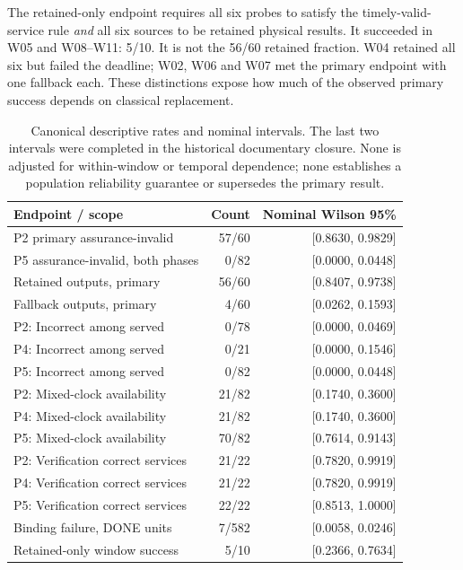 \documentclass[11pt,a4paper]{article}
\begin{document}
The retained-only endpoint requires all six probes to satisfy the timely-valid-service rule \emph{and} all six sources to be retained physical results. It succeeded in W05 and W08--W11: 5/10. It is not the 56/60 retained fraction. W04 retained all six but failed the deadline; W02, W06 and W07 met the primary endpoint with one fallback each. These distinctions expose how much of the observed primary success depends on classical replacement.

\begin{table}[htbp]\centering\small
\begin{tabular}{lrr}\toprule
Endpoint / scope & Count & Nominal Wilson 95\%\\\midrule
P2 primary assurance-invalid & 57/60 & [0.8630, 0.9829]\\
P5 assurance-invalid, both phases & 0/82 & [0.0000, 0.0448]\\
Retained outputs, primary & 56/60 & [0.8407, 0.9738]\\
Fallback outputs, primary & 4/60 & [0.0262, 0.1593]\\
P2: Incorrect among served & 0/78 & [0.0000, 0.0469]\\
P4: Incorrect among served & 0/21 & [0.0000, 0.1546]\\
P5: Incorrect among served & 0/82 & [0.0000, 0.0448]\\
P2: Mixed-clock availability & 21/82 & [0.1740, 0.3600]\\
P4: Mixed-clock availability & 21/82 & [0.1740, 0.3600]\\
P5: Mixed-clock availability & 70/82 & [0.7614, 0.9143]\\
P2: Verification correct services & 21/22 & [0.7820, 0.9919]\\
P4: Verification correct services & 21/22 & [0.7820, 0.9919]\\
P5: Verification correct services & 22/22 & [0.8513, 1.0000]\\
Binding failure, DONE units & 7/582 & [0.0058, 0.0246]\\
Retained-only window success & 5/10 & [0.2366, 0.7634]\\
\bottomrule
\end{tabular}
{}
\caption{Canonical descriptive rates and nominal intervals. The last two intervals were completed in the historical documentary closure. None is adjusted for within-window or temporal dependence; none establishes a population reliability guarantee or supersedes the primary result.}\label{tab:rates}
\end{table}
\end{document}
